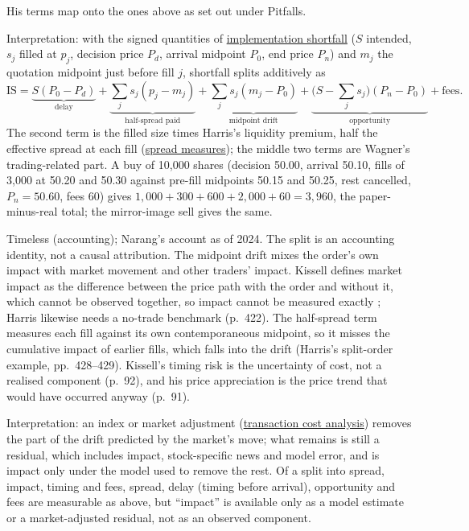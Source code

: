 \begin{qfdefinition}
His terms map onto the ones above as set out under Pitfalls.

 Interpretation: with the signed quantities of \hyperref[def:implementation-shortfall]{implementation shortfall} ($S$ intended, $s_j$ filled at $p_j$, decision price $P_d$, arrival midpoint $P_0$, end price $P_n$) and $m_j$ the quotation midpoint just before fill $j$, shortfall splits additively as
\[ \mathrm{IS}=\underbrace{S(P_0-P_d)}_{\text{delay}}+\underbrace{\textstyle\sum_js_j(p_j-m_j)}_{\text{half-spread paid}}+\underbrace{\textstyle\sum_js_j(m_j-P_0)}_{\text{midpoint drift}}+\underbrace{\bigl(S-\textstyle\sum_js_j\bigr)(P_n-P_0)}_{\text{opportunity}}+\text{fees}. \]
The second term is the filled size times Harris's liquidity premium, half the effective spread at each fill (\hyperref[def:spread-measures]{spread measures}); the middle two terms are Wagner's trading-related part. A buy of 10{,}000 shares (decision 50.00, arrival 50.10, fills of 3{,}000 at 50.20 and 50.30 against pre-fill midpoints 50.15 and 50.25, rest cancelled, $P_n=50.60$, fees 60) gives $1{,}000+300+600+2{,}000+60=3{,}960$, the paper-minus-real total; the mirror-image sell gives the same.

 Timeless (accounting); Narang's account as of 2024. The split is an accounting identity, not a causal attribution. The midpoint drift mixes the order's own impact with market movement and other traders' impact. Kissell defines market impact as the difference between the price path with the order and without it, which cannot be observed together, so impact cannot be measured exactly \citep[chap.~3, pp.~91--92]{s7-kissellscience}; Harris likewise needs a no-trade benchmark (p.~422). The half-spread term measures each fill against its own contemporaneous midpoint, so it misses the cumulative impact of earlier fills, which falls into the drift (Harris's split-order example, pp.~428--429). Kissell's timing risk is the uncertainty of cost, not a realised component (p.~92), and his price appreciation is the price trend that would have occurred anyway (p.~91).

 Interpretation: an index or market adjustment (\hyperref[meth:transaction-cost-analysis]{transaction cost analysis}) removes the part of the drift predicted by the market's move; what remains is still a residual, which includes impact, stock-specific news and model error, and is impact only under the model used to remove the rest. Of a split into spread, impact, timing and fees, spread, delay (timing before arrival), opportunity and fees are measurable as above, but ``impact'' is available only as a model estimate or a market-adjusted residual, not as an observed component.


\end{qfdefinition}
